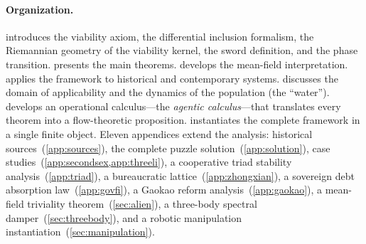 \paragraph{Organization.}
 introduces the viability axiom, the differential
inclusion formalism, the Riemannian geometry of the viability kernel,
the sword definition, and the phase transition.
 presents the main theorems.
 develops the mean-field interpretation.
 applies the framework to historical and
contemporary systems.
 discusses the domain of applicability and the
dynamics of the population (the ``water'').
 develops an operational calculus---the
\emph{agentic calculus}---that translates every theorem into a
flow-theoretic proposition.
 instantiates the complete framework in a single
finite object.
Eleven appendices extend the analysis: historical
sources~(\cref{app:sources}), the complete puzzle
solution~(\cref{app:solution}),
case studies~(\cref{app:secondsex,app:threeli}),
a cooperative triad stability analysis~(\cref{app:triad}),
a bureaucratic lattice~(\cref{app:zhongxian}),
a sovereign debt absorption law~(\cref{app:govfi}),
a Gaokao reform analysis~(\cref{app:gaokao}),
a mean-field triviality theorem~(\cref{sec:alien}),
a three-body spectral damper~(\cref{sec:threebody}),
and a robotic manipulation instantiation~(\cref{sec:manipulation}).
